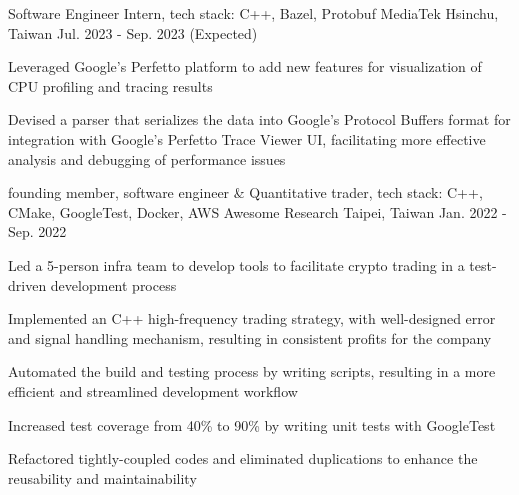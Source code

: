 

\begin{cventries}

  \cventry
    {Software Engineer Intern, \color{awesome}tech stack: C++, Bazel, Protobuf} %
    {MediaTek} %
    {Hsinchu, Taiwan} %
    {Jul. 2023 - Sep. 2023 (Expected)} %
    {
      \begin{cvitems} %
        \item {Leveraged Google's Perfetto platform to add new features for visualization of CPU profiling and tracing results}
        \item {Devised a parser that serializes the data into Google's Protocol Buffers format for integration with Google's Perfetto Trace Viewer UI, facilitating more effective analysis and debugging of performance issues}
      \end{cvitems}
    }

  \cventry
    {founding member, software engineer \& Quantitative trader, \color{awesome} tech stack: C++, CMake, GoogleTest, Docker, AWS} %
    {Awesome Research} %
    {Taipei, Taiwan} %
    {Jan. 2022 - Sep. 2022} %
    {
      \begin{cvitems} %
        \item Led a 5-person infra team to develop tools to facilitate crypto trading in a test-driven development process
        \item Implemented an C++ high-frequency trading strategy, with well-designed error and signal handling mechanism, resulting in consistent profits for the company 
        \item Automated the build and testing process by writing scripts, resulting in a more efficient and streamlined development workflow
        \item Increased test coverage from 40\% to 90\% by writing unit tests with GoogleTest
        \item Refactored tightly-coupled codes and eliminated duplications to enhance the reusability and maintainability
      \end{cvitems}
    }

\end{cventries}
